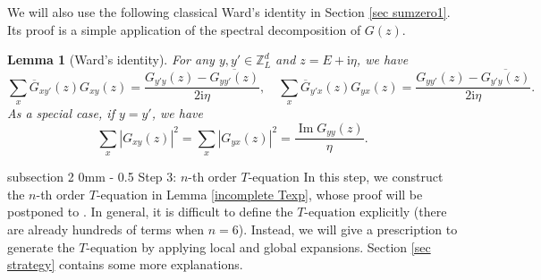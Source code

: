 \documentclass{article}
\makeatletter
\newcommand{\1}{\mathds{1}}
\numberwithin{equation}{section}
\newcommand{\be}{\begin{equation}}
\newcommand{\ee}{\end{equation}}
\newcommand{\ii}{\mathrm{i}} %
\newcommand{\Z}{\mathbb{Z}}
\DeclareMathOperator{\im}{Im}
\theoremstyle{plain} %
\newtheorem{lemma}[theorem]{Lemma}
\theoremstyle{remark}
\newcommand{\cor}{\color{red}}
\newcommand{\cob}{\color{purple}}
\newcommand{\incomp}{{\text{$T$-equation}}}
\renewcommand{\subsection}{\@startsection
{subsection}%
{2}%
{0mm}%
{-\baselineskip}%
{0.5\baselineskip}%
{\normalfont\bf\itshape}} %
\makeatother
\begin{document}
We will also use the following classical Ward's identity in Section \ref{sec sumzero1}. Its proof is a simple application of the spectral decomposition of $G(z)$.
\begin{lemma}[Ward's identity]\label{lem ward}
	For any $y,y'\in \Z_L^d$ and $z=E+\ii \eta$, we have 
	\be\label{eq_Ward0}
	\sum_x \overline G_{xy'}( z) G_{xy}( z) = \frac{G_{y'y}(z)-\overline{G_{yy'}(z)}}{2\ii \eta},\quad \sum_x \overline G_{y' x}( z) G_{yx}( z) = \frac{G_{yy'}(z)-\overline{G_{y'y}(z)}}{2\ii \eta}.
	\ee
	As a special case, if $y=y'$, we have
	\be\label{eq_Ward}
	\sum_x |G_{xy}( z)|^2 =\sum_x |G_{yx}( z)|^2 = \frac{\im G_{yy}(z) }{ \eta}.
	\ee
\end{lemma}

\setcounter{theorem}{6}
\setcounter{equation}{33}

\subsection{Step 3: $n$-th order $\incomp$}
In this step, we construct the $n$-th order {$\incomp$} in Lemma \ref{incomplete Texp}, whose proof will be postponed to \cite{PartII_high}. In general, it is difficult to define the $\incomp$ explicitly (there are already hundreds of terms when $n=6$). Instead, we will give a prescription to generate the $\incomp$ by applying local and global expansions.  %
Section \ref{sec strategy} contains some more explanations.  %
\end{document}
